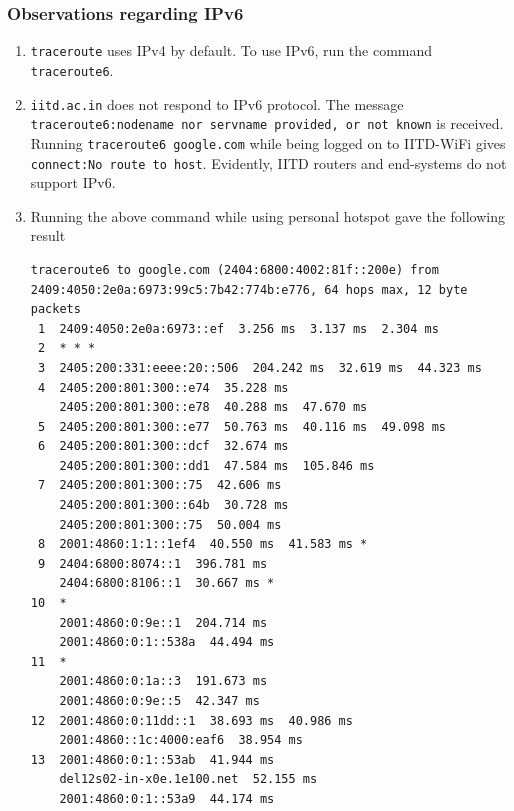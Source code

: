 \documentclass[a4paper]{article}
\begin{document}
\subsubsection{Observations regarding IPv6}
\begin{enumerate}
    \item \texttt{traceroute} uses IPv4 by default. To use IPv6, run the command \texttt{traceroute6}.
    \item \texttt{iitd.ac.in} does not respond to IPv6 protocol. The message \texttt{traceroute6:nodename nor servname provided, or not known} is received. Running \texttt{traceroute6 google.com} while being logged on to IITD-WiFi gives \texttt{connect:No route to host}.
    Evidently, IITD routers and end-systems do not support IPv6.
    \item Running the above command while using personal hotspot gave the following result
    \begin{lstlisting}
traceroute6 to google.com (2404:6800:4002:81f::200e) from 2409:4050:2e0a:6973:99c5:7b42:774b:e776, 64 hops max, 12 byte packets
 1  2409:4050:2e0a:6973::ef  3.256 ms  3.137 ms  2.304 ms
 2  * * *
 3  2405:200:331:eeee:20::506  204.242 ms  32.619 ms  44.323 ms
 4  2405:200:801:300::e74  35.228 ms
    2405:200:801:300::e78  40.288 ms  47.670 ms
 5  2405:200:801:300::e77  50.763 ms  40.116 ms  49.098 ms
 6  2405:200:801:300::dcf  32.674 ms
    2405:200:801:300::dd1  47.584 ms  105.846 ms
 7  2405:200:801:300::75  42.606 ms
    2405:200:801:300::64b  30.728 ms
    2405:200:801:300::75  50.004 ms
 8  2001:4860:1:1::1ef4  40.550 ms  41.583 ms *
 9  2404:6800:8074::1  396.781 ms
    2404:6800:8106::1  30.667 ms *
10  *
    2001:4860:0:9e::1  204.714 ms
    2001:4860:0:1::538a  44.494 ms
11  *
    2001:4860:0:1a::3  191.673 ms
    2001:4860:0:9e::5  42.347 ms
12  2001:4860:0:11dd::1  38.693 ms  40.986 ms
    2001:4860::1c:4000:eaf6  38.954 ms
13  2001:4860:0:1::53ab  41.944 ms
    del12s02-in-x0e.1e100.net  52.155 ms
    2001:4860:0:1::53a9  44.174 ms
    \end{lstlisting}
\end{enumerate}
\end{document}
